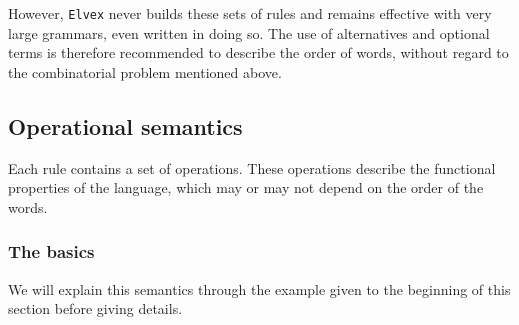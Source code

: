\documentclass[11pt]{article}
\begin{document}
However, \texttt{Elvex} never builds these sets of rules
and remains effective with very large grammars, even written in doing so.
The use of alternatives and optional terms is therefore
recommended to describe the order of words, without regard to
the combinatorial problem mentioned above.

\subsection{Operational semantics}

Each rule contains a set of operations. These operations describe the
functional properties of the language, which may or may not depend on
the order of the words.

\subsubsection*{The basics}

We will explain this semantics through the example given to the
beginning of this section before giving details.
\end{document}
